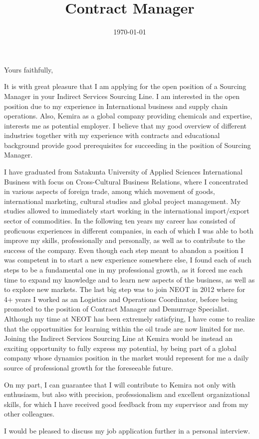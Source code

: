\documentclass[11pt,a4paper,sans]{moderncv}        %
\title{Contract Manager}                               %
\begin{document}
\date{\today}
\closing{Yours faithfully,}
\makelettertitle

\hspace*{-5cm}

It is with great pleasure that I am applying for the open position of a Sourcing Manager in your Indirect Services Sourcing Line.
I am interested in the open position due to my experience in International
business and supply chain operations. Also, Kemira as a global company providing chemicals and expertise, interests me as potential employer. I
believe that my good overview of different industries together with my experience with contracts and
educational background provide good prerequisites for succeeding in the position of Sourcing Manager.


I have graduated from Satakunta University of Applied Sciences International Business with focus on
Cross-Cultural Business Relations, where I concentrated in various aspects of foreign trade, among which  movement of goods, international marketing, cultural studies and
global project management. My studies allowed to immediately start working in the international import/export sector
of commodities. In the following ten years my career has consisted of proficuous experiences in different companies, in each of which
I was able to both improve my skills, professionally and personally, as well as to contribute to the success of the company. Even though
each step meant to abandon a position I was competent in to start a new experience somewhere else, I found each of such steps to be a fundamental
one in my professional growth, as it forced me each time to expand my knowledge and to learn new aspects of the business, as well as to
explore new markets. The last big step was to join NEOT in 2012 where for 4+ years I worked as an Logistics
and Operations Coordinator, before being promoted to the position of Contract Manager and Demurrage Specialist. Although my time at NEOT has 
been extremely satisfying, I have come to realize that the opportunities for learning within the oil trade are now limited for me. Joining
the Indirect Services Sourcing Line at Kemira would be instead an exciting opportunity to fully express my potential, by being
part of a global company whose dynamics position in the market would represent for me a daily source of professional
growth for the foreseeable future.

On my part, I can guarantee that I will contribute to Kemira not only with enthusiasm, but also with precision, professionalism
and excellent organizational skills, for which I have received good feedback from my supervisor and from my other
colleagues.

I would be pleased to discuss my job application further in a personal interview.
\\

\makeletterclosing
\end{document}
